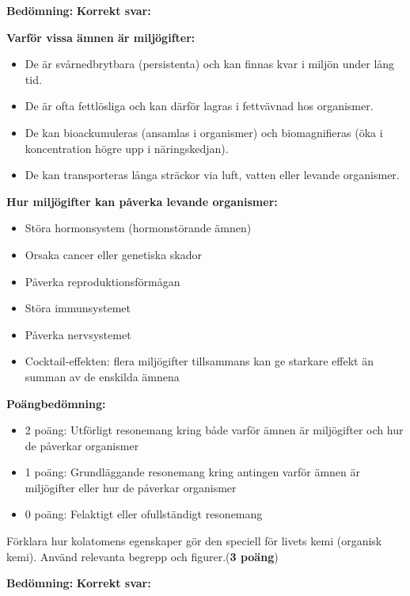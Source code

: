 \documentclass[12pt]{exam}
\newenvironment{answer}
  {\begin{framed}\color{blue}\textbf{Bedömning:} }
  {\end{framed}}
\begin{document}
\begin{questions}
\begin{answer}
\textbf{Korrekt svar:}

\textbf{Varför vissa ämnen är miljögifter:}
\begin{itemize}
  \item De är svårnedbrytbara (persistenta) och kan finnas kvar i miljön under lång tid.
  \item De är ofta fettlösliga och kan därför lagras i fettvävnad hos organismer.
  \item De kan bioackumuleras (ansamlas i organismer) och biomagnifieras (öka i koncentration högre upp i näringskedjan).
  \item De kan transporteras långa sträckor via luft, vatten eller levande organismer.
\end{itemize}

\textbf{Hur miljögifter kan påverka levande organismer:}
\begin{itemize}
  \item Störa hormonsystem (hormonstörande ämnen)
  \item Orsaka cancer eller genetiska skador
  \item Påverka reproduktionsförmågan
  \item Störa immunsystemet
  \item Påverka nervsystemet
  \item Cocktail-effekten: flera miljögifter tillsammans kan ge starkare effekt än summan av de enskilda ämnena
\end{itemize}

\textbf{Poängbedömning:}
\begin{itemize}
  \item 2 poäng: Utförligt resonemang kring både varför ämnen är miljögifter och hur de påverkar organismer
  \item 1 poäng: Grundläggande resonemang kring antingen varför ämnen är miljögifter eller hur de påverkar organismer
  \item 0 poäng: Felaktigt eller ofullständigt resonemang
\end{itemize}
\end{answer}
\vspace{5mm}

\question Förklara hur kolatomens egenskaper gör den speciell för livets kemi (organisk kemi). Använd relevanta begrepp och figurer.(\textbf{3 poäng})
\vspace{5mm}

\begin{answer}
\textbf{Korrekt svar:}


\end{answer}
\end{questions}
\end{document}
